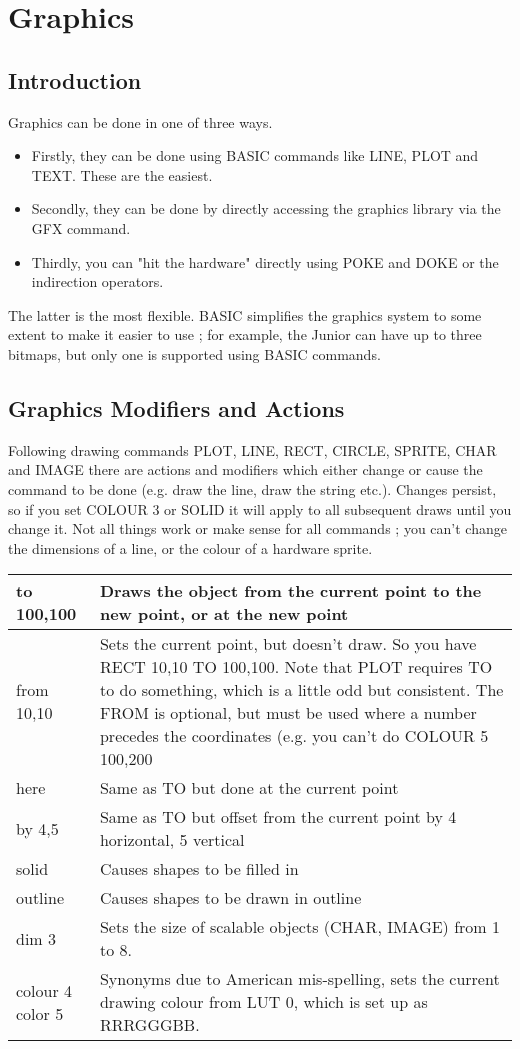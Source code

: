 \chapter{Graphics}

\section{Introduction}

Graphics can be done in one of three ways. 

\begin{itemize}
\item Firstly, they can be done using BASIC commands like LINE, PLOT and TEXT. These are the easiest.
\item Secondly, they can be done by directly accessing the graphics library via the GFX command. 
\item Thirdly, you can "hit the hardware" directly using POKE and DOKE or the indirection operators.
\end{itemize}
The latter is the most flexible. BASIC simplifies the graphics system to some extent to make it easier to use ; for example, the Junior can have up to three bitmaps, but only one is supported using BASIC commands.

\section{Graphics Modifiers and Actions}
Following drawing commands PLOT, LINE, RECT, CIRCLE, SPRITE, CHAR and IMAGE there are actions and modifiers which either change or cause the command to be done (e.g. draw the line, draw the string etc.). 
Changes persist, so if you set COLOUR 3 or SOLID it will apply to all subsequent draws until you change it.
Not all things work or make sense for all commands ; you can’t change the dimensions of a line, or the colour of a hardware sprite.

\begin{tabular} {|p{1.0in}|p{4.5in}|}
\hline
to 100,100 & Draws the object from the current point to the new point, or at the new point \\
\hline
from 10,10 & Sets the current point, but doesn’t draw. So you have RECT 10,10 TO 100,100. Note that PLOT requires TO to do something, which is a little odd but consistent. The FROM is optional, but must be used where a number precedes the coordinates (e.g. you can’t do COLOUR 5 100,200 \\
\hline
here & Same as TO but done at the current point \\
\hline
by 4,5 & Same as TO but offset from the current point by 4 horizontal, 5 vertical \\
\hline
solid & Causes shapes to be filled in\\
\hline
outline & Causes shapes to be drawn in outline\\
\hline
dim 3 & Sets the size of scalable objects (CHAR, IMAGE) from 1 to 8.\\
\hline
colour 4 color 5 & Synonyms due to American mis-spelling, sets the current drawing colour from LUT 0, which is set up as  RRRGGGBB. \\
\hline
\end{tabular}

